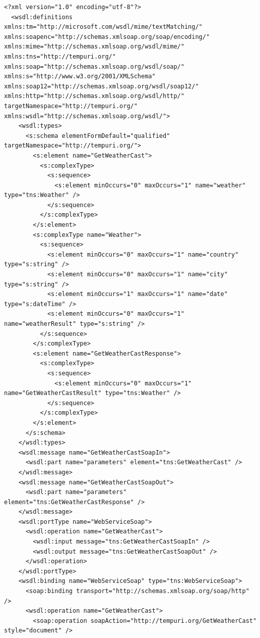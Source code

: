 \begin{lstlisting}[caption=WSDL Document for Weathercast Provider, label=lst:wsdldocument]
  <?xml version="1.0" encoding="utf-8"?>
  <wsdl:definitions xmlns:tm="http://microsoft.com/wsdl/mime/textMatching/" xmlns:soapenc="http://schemas.xmlsoap.org/soap/encoding/" xmlns:mime="http://schemas.xmlsoap.org/wsdl/mime/" xmlns:tns="http://tempuri.org/" xmlns:soap="http://schemas.xmlsoap.org/wsdl/soap/" xmlns:s="http://www.w3.org/2001/XMLSchema" xmlns:soap12="http://schemas.xmlsoap.org/wsdl/soap12/" xmlns:http="http://schemas.xmlsoap.org/wsdl/http/" targetNamespace="http://tempuri.org/" xmlns:wsdl="http://schemas.xmlsoap.org/wsdl/">
    <wsdl:types>
      <s:schema elementFormDefault="qualified" targetNamespace="http://tempuri.org/">
        <s:element name="GetWeatherCast">
          <s:complexType>
            <s:sequence>
              <s:element minOccurs="0" maxOccurs="1" name="weather" type="tns:Weather" />
            </s:sequence>
          </s:complexType>
        </s:element>
        <s:complexType name="Weather">
          <s:sequence>
            <s:element minOccurs="0" maxOccurs="1" name="country" type="s:string" />
            <s:element minOccurs="0" maxOccurs="1" name="city" type="s:string" />
            <s:element minOccurs="1" maxOccurs="1" name="date" type="s:dateTime" />
            <s:element minOccurs="0" maxOccurs="1" name="weatherResult" type="s:string" />
          </s:sequence>
        </s:complexType>
        <s:element name="GetWeatherCastResponse">
          <s:complexType>
            <s:sequence>
              <s:element minOccurs="0" maxOccurs="1" name="GetWeatherCastResult" type="tns:Weather" />
            </s:sequence>
          </s:complexType>
        </s:element>
      </s:schema>
    </wsdl:types>
    <wsdl:message name="GetWeatherCastSoapIn">
      <wsdl:part name="parameters" element="tns:GetWeatherCast" />
    </wsdl:message>
    <wsdl:message name="GetWeatherCastSoapOut">
      <wsdl:part name="parameters" element="tns:GetWeatherCastResponse" />
    </wsdl:message>
    <wsdl:portType name="WebServiceSoap">
      <wsdl:operation name="GetWeatherCast">
        <wsdl:input message="tns:GetWeatherCastSoapIn" />
        <wsdl:output message="tns:GetWeatherCastSoapOut" />
      </wsdl:operation>
    </wsdl:portType>
    <wsdl:binding name="WebServiceSoap" type="tns:WebServiceSoap">
      <soap:binding transport="http://schemas.xmlsoap.org/soap/http" />
      <wsdl:operation name="GetWeatherCast">
        <soap:operation soapAction="http://tempuri.org/GetWeatherCast" style="document" />

\end{lstlisting}
